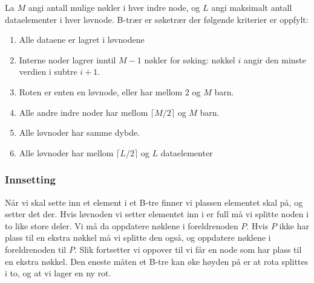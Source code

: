 \begin{definition} La $ M $ angi antall mulige nøkler i hver indre node, og $ L $ angi maksimalt antall dataelementer i hver løvnode. B-trær er søketrær der følgende kriterier er oppfylt:
\begin{enumerate}[i]
\item Alle dataene er lagret i løvnodene
\item Interne noder lagrer inntil $ M-1 $ nøkler for søking: nøkkel $ i $ angir den minste verdien i subtre $ i+1 $.
\item Roten er enten en løvnode, eller har mellom 2 og $ M $ barn. 
\item Alle andre indre noder har mellom $ \lceil M/2\rceil $ og $ M $ barn. 
\item Alle løvnoder har samme dybde.
\item Alle løvnoder har mellom $ \lceil L/2\rceil $ og $ L $ dataelementer
\end{enumerate}
\label{def:b_tre}
\end{definition}


\subsubsection{Innsetting}
Når vi skal sette inn et element i et B-tre finner vi plassen elementet skal på, og setter det der. Hvis løvnoden vi setter elementet inn i er full må vi splitte noden i to like store deler. Vi må da oppdatere nøklene i foreldrenoden $ P $. Hvis $ P $ ikke har plass til en ekstra nøkkel må vi splitte den også, og oppdatere nøklene i foreldrenoden til $ P $. Slik fortsetter vi oppover til vi får en node som har plass til en ekstra nøkkel. Den eneste måten et B-tre kan øke høyden på er at rota splittes i to, og at vi lager en ny rot. 


